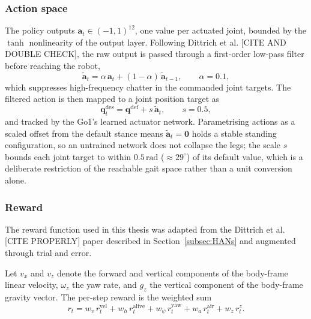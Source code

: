 \documentclass{article} %
\begin{document}
\subsubsection{Action space}
\label{subsec:action_space}
The policy outputs $\mathbf{a}_t \in (-1, 1)^{12}$, one value per actuated
joint, bounded by the $\tanh$ nonlinearity of the output layer. Following
Dittrich et al. [CITE AND DOUBLE CHECK], the raw output is passed through a first-order low-pass filter
before reaching the robot,
\begin{equation}
\tilde{\mathbf{a}}_t = \alpha\,\mathbf{a}_t
+ (1 - \alpha)\,\tilde{\mathbf{a}}_{t-1},
\qquad \alpha = 0.1,
\label{eq:act-filter}
\end{equation}
which suppresses high-frequency chatter in the commanded joint targets. The
filtered action is then mapped to a joint position target as
\begin{equation}
\mathbf{q}^{\mathrm{des}}_t = \mathbf{q}^{\mathrm{def}}
+ s\,\tilde{\mathbf{a}}_t, \qquad s = 0.5,
\label{eq:act}
\end{equation}
and tracked by the Go1's learned actuator network. Parametrising actions as a
scaled offset from the default stance means $\tilde{\mathbf{a}}_t = \mathbf{0}$
holds a stable standing configuration, so an untrained network does not
collapse the legs; the scale $s$ bounds each joint target to within
$0.5\,\mathrm{rad}$ ($\approx 29^\circ$) of its default value, which is a
deliberate restriction of the reachable gait space rather than a unit
conversion alone.

\subsubsection{Reward}
\label{subsec:reward}

The reward function used in this thesis was adapted from the Dittrich et al. [CITE PROPERLY] paper described in Section~\ref{subsec:HANs} and augmented through trial and error. 

Let $v_x$ and $v_z$ denote the forward and vertical components of the
body-frame linear velocity, $\omega_z$ the yaw rate, and $g_z$ the vertical
component of the body-frame gravity vector. The per-step reward is the
weighted sum
\begin{equation}
r_t = w_v\, r^{\mathrm{vel}}_t + w_h\, r^{\mathrm{alive}}_t
    + w_\psi\, r^{\mathrm{yaw}}_t + w_a\, r^{\mathrm{air}}_t
    + w_z\, r^{z}_t .
\label{eq:reward}
\end{equation}
\end{document}
